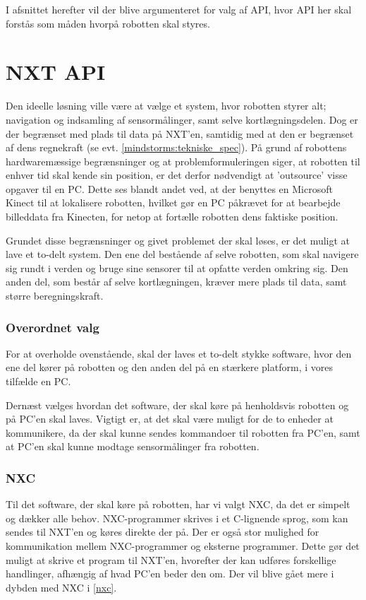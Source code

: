 I afsnittet herefter vil der blive argumenteret for valg af API, hvor API her skal forstås som måden hvorpå robotten skal styres.

\section{NXT API}\label{nxt_api}
Den ideelle løsning ville være at vælge et system, hvor robotten styrer alt; navigation og indsamling af sensormålinger, samt selve kortlægningsdelen.
Dog er der begrænset med plads til data på NXT'en, samtidig med at den er begrænset af dens regnekraft (se evt. \cref{mindstorms:tekniske_spec}).
På grund af robottens hardwaremæssige begrænsninger og at problemformuleringen siger, at robotten til enhver tid skal kende sin position, er det derfor nødvendigt at 'outsource' visse opgaver til en PC.
Dette ses blandt andet ved, at der benyttes en Microsoft Kinect til at lokalisere robotten, hvilket gør en PC påkrævet for at bearbejde billeddata fra Kinecten, for netop at fortælle robotten dens faktiske position.

Grundet disse begrænsninger og givet problemet der skal løses, er det muligt at lave et to-delt system.
Den ene del bestående af selve robotten, som skal navigere sig rundt i verden og bruge sine sensorer til at opfatte verden omkring sig.
Den anden del, som består af selve kortlægningen, kræver mere plads til data, samt større beregningskraft.

\subsubsection*{Overordnet valg}
For at overholde ovenstående, skal der laves et to-delt stykke software, hvor den ene del kører på robotten og den anden del på en stærkere platform, i vores tilfælde en PC.

Dernæst vælges hvordan det software, der skal køre på henholdsvis robotten og på PC'en skal laves.
Vigtigt er, at det skal være muligt for de to enheder at kommunikere, da der skal kunne sendes kommandoer til robotten fra PC'en, samt at PC'en skal kunne modtage sensormålinger fra robotten.

\subsubsection*{NXC}
Til det software, der skal køre på robotten, har vi valgt NXC, da det er simpelt og dækker alle behov.
NXC-programmer skrives i et C-lignende sprog, som kan sendes til NXT'en og køres direkte der på.
Der er også stor mulighed for kommunikation mellem NXC-programmer og eksterne programmer.
Dette gør det muligt at skrive et program til NXT'en, hvorefter der kan udføres forskellige handlinger, afhængig af hvad PC'en beder den om.
Der vil blive gået mere i dybden med NXC i \cref{nxc}.

